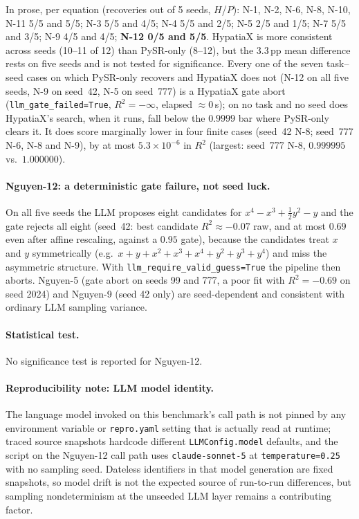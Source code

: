 \documentclass[twoside,11pt]{article}
\newcommand{\Rsq}{R^{2}}
\begin{document}
In prose, per equation (recoveries out of 5 seeds, $H$/$P$): N-1, N-2, N-6, N-8, N-10, N-11
5/5 and 5/5; N-3 5/5 and 4/5; N-4 5/5 and 2/5; N-5 2/5 and 1/5; N-7 5/5 and 3/5;
N-9 4/5 and 4/5; \textbf{N-12 0/5 and 5/5}. HypatiaX is more consistent across
seeds (10--11 of 12) than PySR-only (8--12), but the 3.3\,pp mean difference
rests on five seeds and is not tested for significance. Every one of the seven task--seed cases on which
PySR-only recovers and HypatiaX does not (N-12 on all five seeds, N-9 on seed~42, N-5 on seed~777) is a HypatiaX gate abort (\texttt{llm\_gate\_failed=True},
$\Rsq=-\infty$, elapsed $\approx0$\,s); on no task and no seed does HypatiaX's search,
when it runs, fall below the $0.9999$ bar where PySR-only clears it. It does score marginally lower in four finite
cases (seed~42 N-8; seed~777 N-6, N-8 and N-9), by at most $5.3\times10^{-6}$ in $\Rsq$ (largest: seed~777 N-8,
$0.999995$ vs.\ $1.000000$).

\paragraph{Nguyen-12: a deterministic gate failure, not seed luck.} On all five
seeds the LLM proposes eight candidates for $x^4-x^3+\tfrac12y^2-y$ and the gate
rejects all eight (seed~42: best candidate $\Rsq\approx-0.07$ raw, and at most $0.69$ even after affine rescaling, against a $0.95$ gate), because the
candidates treat $x$ and $y$ symmetrically (e.g.\ $x+y+x^2+x^3+x^4+y^2+y^3+y^4$)
and miss the asymmetric structure. With \texttt{llm\_require\_valid\_guess=True}
the pipeline then aborts. Nguyen-5 (gate abort on seeds 99 and 777, a poor fit
with $\Rsq=-0.69$ on seed 2024) and Nguyen-9 (seed 42 only) are seed-dependent
and consistent with ordinary LLM sampling variance.


\paragraph{Statistical test.} No significance test is reported for Nguyen-12.

\paragraph{Reproducibility note: LLM model identity.} The language model invoked on this benchmark's call path is not pinned by any environment variable or \texttt{repro.yaml} setting that is actually read at runtime; traced source snapshots hardcode different \texttt{LLMConfig.model} defaults, and the script on the Nguyen-12 call path uses \texttt{claude-sonnet-5} at \texttt{temperature=0.25} with no sampling seed. Dateless identifiers in that model generation are fixed snapshots, so model drift is not the expected source of run-to-run differences, but sampling nondeterminism at the unseeded LLM layer remains a contributing factor.
\end{document}
